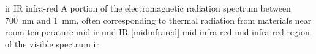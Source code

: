 \newglsXacronym%
{ir}%
{IR}%
{infra-red}%
{A portion of the electromagnetic radiation spectrum between \SI{700}{\nano\meter} and \SI{1}{\milli\meter}, often corresponding to thermal radiation from materials near room temperature}%
\newglsXacronym%
{mid-ir}%
{mid{\--}IR}%
[midinfrared]%
{mid infra-red}%
{mid infra-red region of the visible spectrum}%
{ir}%

